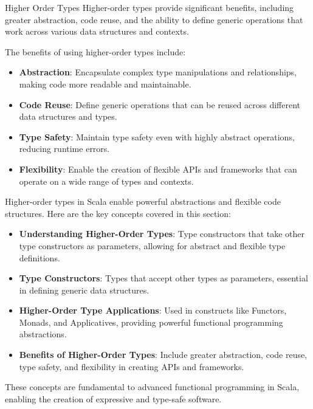 \begin{notes}{Higher Order Types}
    Higher-order types provide significant benefits, including greater abstraction, code reuse, and the ability to define generic operations that work across various data structures and contexts.
    
    \begin{highlight}
    
        The benefits of using higher-order types include:
    
        \begin{itemize}
            \item \textbf{Abstraction}: Encapsulate complex type manipulations and relationships, making code more readable and maintainable.
            \item \textbf{Code Reuse}: Define generic operations that can be reused across different data structures and types.
            \item \textbf{Type Safety}: Maintain type safety even with highly abstract operations, reducing runtime errors.
            \item \textbf{Flexibility}: Enable the creation of flexible APIs and frameworks that can operate on a wide range of types and contexts.
        \end{itemize}
    
    \end{highlight}
    
    \begin{highlight}
    
        Higher-order types in Scala enable powerful abstractions and flexible code structures. Here are the key concepts covered in this section:
    
        \begin{itemize}
            \item \textbf{Understanding Higher-Order Types}: Type constructors that take other type constructors as parameters, allowing for abstract and flexible type definitions.
            \item \textbf{Type Constructors}: Types that accept other types as parameters, essential in defining generic data structures.
            \item \textbf{Higher-Order Type Applications}: Used in constructs like Functors, Monads, and Applicatives, providing powerful functional programming abstractions.
            \item \textbf{Benefits of Higher-Order Types}: Include greater abstraction, code reuse, type safety, and flexibility in creating APIs and frameworks.
        \end{itemize}
    
        These concepts are fundamental to advanced functional programming in Scala, enabling the creation of expressive and type-safe software.
    
    \end{highlight}
\end{notes}
